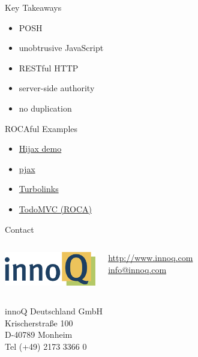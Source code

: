 \documentclass{beamer}
\begin{document}
\begin{frame}{Key Takeaways}
  \begin{itemize}
    \item POSH
    \item unobtrusive JavaScript
    \item RESTful HTTP
    \item server-side authority
    \item no duplication
  \end{itemize}
\end{frame}

\begin{frame}{ROCAful Examples}
  \begin{itemize}
    \item \href{http://fnd.github.com/hijax-demo/}{Hijax demo}
    \item \href{http://pjax.heroku.com}{pjax}
    \item \href{https://github.com/rails/turbolinks}{Turbolinks}
    \item \href{http://rocatodo.herokuapp.com}{TodoMVC (ROCA)}
  \end{itemize}
\end{frame}

\begin{frame}{Contact}
  \begin{columns}
    \column{5cm}
    \includegraphics[width=4cm]{images/innoQ-Logo-RGB-72dpi.png}
    \vspace{4mm}
    \column{4.5cm}

    \href{http://www.innoq.com}{http://www.innoq.com} \\
    \href{mailto:info@innoq.com}{info@innoq.com}
  \end{columns}

  innoQ Deutschland GmbH \\
  Krischerstraße 100 \\
  D-40789 Monheim \\
  Tel (+49) 2173 3366 0
\end{frame}
\end{document}
